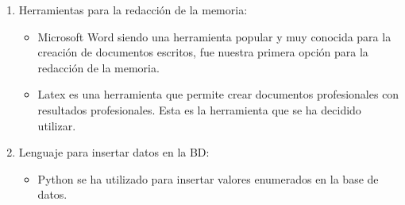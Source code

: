 \documentclass[11pt]{article}
\begin{document}
\begin{enumerate}
	\item Herramientas para la redacción de la memoria:
	\begin{itemize} 
		\item Microsoft Word siendo una herramienta popular y muy conocida para la creación de documentos escritos, fue nuestra primera opción para la redacción de la memoria.
		\item Latex es una herramienta que permite crear documentos profesionales con resultados profesionales. Esta es la herramienta que se ha decidido utilizar.
	\end{itemize}
	\item Lenguaje para insertar datos en la BD:
	\begin{itemize} 
		\item Python se ha utilizado para insertar valores enumerados en la base de datos.
	\end{itemize}
\end{enumerate}
\end{document}
